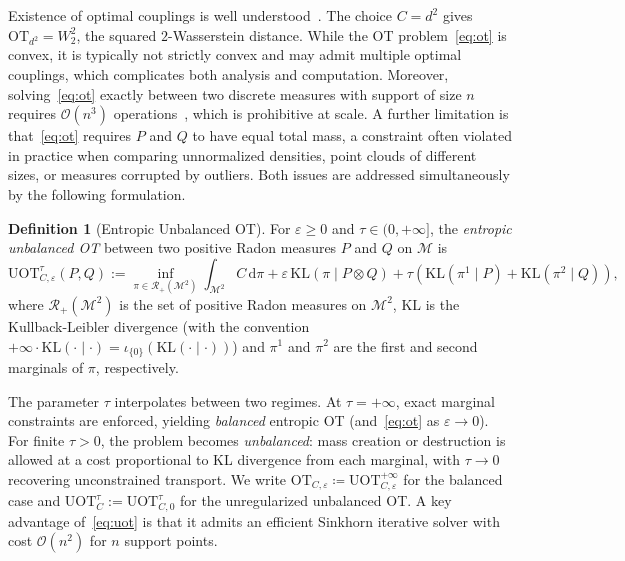 \documentclass{article}
\theoremstyle{plain}
\theoremstyle{definition}
\newtheorem{definition}[theorem]{Definition}
\theoremstyle{remark}
\newcommand{\M}{\ensuremath{\mathcal{M}}}
\begin{document}
Existence of optimal couplings is well understood~\cite{villani2009optimal,santambrogio2015optimal}.
The choice $C=d^2$ gives $\mathrm{OT}_{d^2}=W_2^2$, the squared $2$-Wasserstein distance.
While the OT problem~\eqref{eq:ot} is convex, it is typically not strictly convex and may
admit multiple optimal couplings, which complicates both analysis and computation.
Moreover, solving~\eqref{eq:ot} exactly between two discrete measures with support of size $n$
requires $\mathcal{O}(n^3)$ operations~\cite{peyre2019computational}, which is prohibitive at scale.
A further limitation is that~\eqref{eq:ot} requires $P$ and $Q$ to have equal total mass,
a constraint often violated in practice when comparing unnormalized densities, point clouds
of different sizes, or measures corrupted by outliers. Both issues are addressed simultaneously by the following formulation.

\begin{definition}[Entropic Unbalanced OT]
For $\varepsilon \geq 0$ and $\tau \in (0, +\infty]$, the \emph{entropic unbalanced OT}
between two positive Radon measures $P$ and $Q$ on $\M$ is
\begin{equation}\label{eq:uot}
  \mathrm{UOT}_{C,\varepsilon}^{\tau}(P,Q)
  := \inf_{\pi \in \mathcal{R}_+(\M^2)}
  \int_{\M^2} C\, \mathrm{d}\pi
  + \varepsilon\, \mathrm{KL}(\pi \mid P \otimes Q)
  + \tau\left( \mathrm{KL}(\pi^1 \mid P)
  + \mathrm{KL}(\pi^2 \mid Q)\right),
\end{equation}
where $\mathcal{R}_+(\M^2)$ is the set of positive Radon measures on $\M^2$, $\mathrm{KL}$ is the Kullback-Leibler divergence (with the convention $+\infty \cdot \mathrm{KL}(\cdot\mid\cdot) = \iota_{\{0\}}(\mathrm{KL}(\cdot\mid\cdot))$) and $\pi^1$ and $\pi^2$ are the first and second marginals of $\pi$, respectively.
\end{definition}

The parameter $\tau$ interpolates between two regimes. At $\tau = +\infty$, exact marginal constraints are enforced, yielding \emph{balanced} entropic OT (and~\eqref{eq:ot} as $\varepsilon \to 0$). For finite $\tau > 0$, the problem becomes \emph{unbalanced}: mass creation or destruction is allowed at a cost proportional to KL divergence from each marginal, with $\tau \to 0$ recovering unconstrained transport.
We write $\mathrm{OT}_{C,\varepsilon} \coloneqq \mathrm{UOT}_{C,\varepsilon}^{+\infty}$ for the balanced case and $\mathrm{UOT}_{C}^{\tau} := \mathrm{UOT}_{C,0}^{\tau}$ for the unregularized unbalanced OT.
A key advantage of~\eqref{eq:uot} is that it admits an efficient Sinkhorn iterative solver with cost $\mathcal{O}(n^2)$ for $n$ support points.
\end{document}
